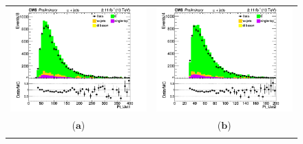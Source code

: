 \documentclass{cmspaper}
\begin{document}
\begin{figure}[htp]
\centering
\begin{tabular}{cc}
\hspace{-0.5cm}
\includegraphics[scale=0.40]{results/Pt_lJet1.png}
& \hspace{-0.5cm} \includegraphics[scale=0.40]{results/Pt_lJet2.png}\\
   ($\mathbf{a}$)\qquad\qquad&($\mathbf{b}$)\qquad\qquad\qquad\\
\hspace{-0.5cm}

\end{tabular}
\end{figure}
\end{document}
